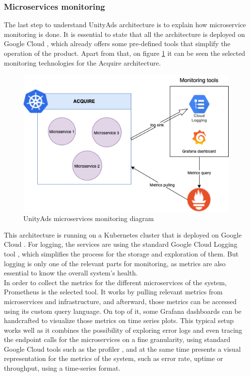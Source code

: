 \documentclass[english, 12pt, a4paper, sci, utf8, a-1b, online]{aaltothesis}
\begin{document}
\subsubsection{Microservices monitoring}

The last step to understand UnityAds architecture is to explain how microservice monitoring is done. It is essential to state that all the architecture is deployed on Google Cloud \cite{aceto2013cloud}, which already offers some pre-defined tools that simplify the operation of the product. Apart from that, on figure \ref{fig:background:monitoring} it can be seen the selected monitoring technologies for the Acquire architecture.\\

\begin{figure}[h]
    \centering
    \includegraphics[scale=0.4]{src/thesis/img/background/service-monitoring.png}
    \caption{UnityAds microservices monitoring diagram}
    \label{fig:background:monitoring}
\end{figure}

This architecture is running on a Kubernetes cluster that is deployed on Google Cloud \cite{hunter2018google}. For logging, the services are using the standard Google Cloud Logging tool \cite{GoogleLogging}, which simplifies the process for the storage and exploration of them. But logging is only one of the relevant parts for monitoring, as metrics are also essential to know the overall system's health.\\

In order to collect the metrics for the different microservices of the system, Prometheus \cite{turnbull2018monitoring} is the selected tool. It works by pulling relevant metrics from microservices and infrastructure, and afterward, those metrics can be accessed using its custom query language. On top of it, some Grafana dashboards \cite{hoang2020research} can be handcrafted to visualize those metrics on time series plots. This typical setup works well as it combines the possibility of exploring error logs and even tracing the endpoint calls for the microservices on a fine granularity, using standard Google Cloud tools such as the profiler \cite{thakurratan2018google}, and at the same time presents a visual representation for the metrics of the system, such as error rate, uptime or throughput, using a time-series format.\\
\end{document}
